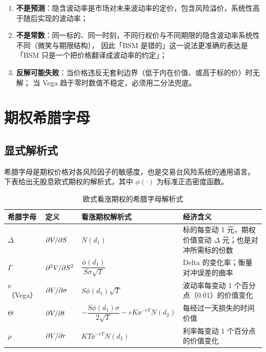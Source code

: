 \begin{warningbox}[隐含波动率的三个陷阱]
\begin{enumerate}[leftmargin=1.6em]
  \item \textbf{不是预测}：隐含波动率是市场对未来波动率的定价，包含风险溢价，系统性高于随后实现的波动率；
  \item \textbf{不是常数}：同一标的、同一时刻，不同行权价与不同期限的隐含波动率系统性不同（微笑与期限结构），
        因此「BSM 是错的」这一说法更准确的表达是「BSM 只是一个把价格翻译成波动率的约定」；
  \item \textbf{反解可能失败}：当价格违反无套利边界（低于内在价值、或高于标的价）时无解；
        当 Vega 趋于零时数值不稳定，必须用二分法兜底。
\end{enumerate}
\end{warningbox}

\section{期权希腊字母}

\subsection{显式解析式}

希腊字母是期权价格对各风险因子的敏感度，也是交易台风险系统的通用语言。
下表给出无股息欧式期权的解析式，其中 $\phi(\cdot)$ 为标准正态密度函数。

\begin{table}[htbp]
\centering
\caption{欧式看涨期权的希腊字母解析式}\label{tab:04-greeks}
\tablefont
\begin{tabularx}{\textwidth}{@{}L{1.5cm}L{2.4cm}Y L{3.4cm}@{}}
\toprule
\textbf{希腊字母} & \textbf{定义} & \textbf{看涨期权解析式} & \textbf{经济含义} \\
\midrule
$\Delta$ & $\partial V/\partial S$ & $N(d_1)$ & 标的每变动 1 元，期权价值变动 $\Delta$ 元；也是对冲所需标的份数 \\
$\Gamma$ & $\partial^2 V/\partial S^2$ & $\dfrac{\phi(d_1)}{S\sigma\sqrt{T}}$ & Delta 的变化率；衡量对冲误差的曲率 \\
$\nu$（Vega） & $\partial V/\partial \sigma$ & $S\phi(d_1)\sqrt{T}$ & 波动率每变动 1 个百分点（0.01）的价值变化 \\
$\Theta$ & $\partial V/\partial t$ & $-\dfrac{S\phi(d_1)\sigma}{2\sqrt{T}} - rK\ee^{-rT}N(d_2)$ & 每经过一天损失的时间价值 \\
$\rho$ & $\partial V/\partial r$ & $KT\ee^{-rT}N(d_2)$ & 利率每变动 1 个百分点的价值变化 \\
\bottomrule
\end{tabularx}
\end{table}

